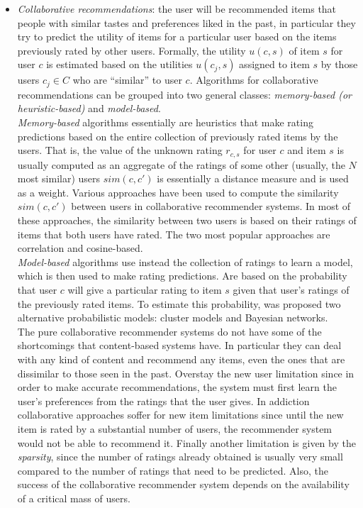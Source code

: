 \documentclass[paper=a4, fontsize=11pt]{scrartcl} %
\numberwithin{equation}{section} %
\numberwithin{figure}{section} %
\numberwithin{table}{section} %
\begin{document}
\begin{itemize}
  \item \textit{Collaborative recommendations}: the user will be
recommended items that people with similar tastes and preferences liked in the
past, in particular they try to predict the utility of items for a particular
user based on the items previously rated by other users. Formally, the utility
$u(c,s)$ of item $s$ for user $c$ is estimated based on the utilities $u(c_j,s)$
assigned to item $s$ by those users $c_j \in C$ who are ``similar'' to user $c$.
Algorithms for collaborative recommendations can be grouped into two general
classes:
\textit{memory-based (or heuristic-based)} and
\textit{model-based}.\\
\textit{Memory-based} algorithms essentially are heuristics that
make rating predictions based on the entire collection of previously rated items by the users. That is, the value of the unknown rating $r_{c,s}$ for user $c$ and item $s$ is usually
computed as an aggregate of the ratings of some other (usually, the $N$ most
similar) users $sim(c,c')$ is essentially a distance measure and is used as a
weight. Various approaches have been used to compute the similarity $sim(c,c')$
between users in collaborative recommender systems. In most of these approaches,
the similarity between two users is based on their ratings of items that both
users have rated. The two most popular approaches are correlation and
cosine-based.\\
\textit{Model-based} algorithms use instead the collection of ratings to learn a
model, which is then used to make rating predictions. Are based on the
probability that user $c$ will give a particular rating to item $s$ given that
user's ratings of the previously rated items. To estimate this probability, was
proposed two alternative probabilistic models: cluster models and Bayesian
networks.\\
The pure collaborative recommender systems do not have some of the shortcomings
that content-based systems have. In particular they can deal with any kind of
content and recommend any items, even the ones that are dissimilar to those seen
in the past. Overstay the new user limitation since in order to make accurate
recommendations, the system must first learn the user's preferences from the
ratings that the user gives. In addiction collaborative approaches soffer for
new item limitations since until the new item is rated by a substantial number
of users, the recommender system would not be able to recommend it. Finally
another limitation is given by the \textit{sparsity}, since the number of
ratings already obtained is usually very small compared to the number of ratings
that need to be predicted. Also, the success of the collaborative recommender
system depends on the availability of a critical mass of users.


\end{itemize}
\end{document}

